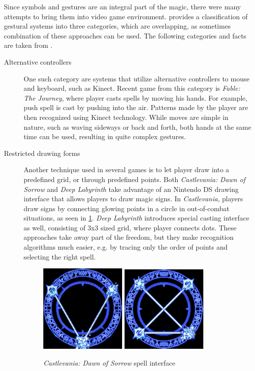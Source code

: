 Since symbols and gestures are an integral part of the magic, there were many attempts to bring them into video game environment. \citet{gameMagic} provides a classification of gestural systems into three categories, which are overlapping, as sometimes combination of these approaches can be used. The following categories and facts are taken from \citet{gameMagic}.

\begin{description}
\item[Alternative controllers]
One such category are systems that utilize alternative controllers to mouse and keyboard, such as Kinect. Recent game from this category is \emph{Fable: The Journey}, where player casts spells by moving his hands. For example, push spell is cast by pushing into the air. Patterns made by the player are then recognized using Kinect technology. While moves are simple in nature, such as waving sideways or back and forth, both hands at the same time can be used, resulting in quite complex gestures.

\item[Restricted drawing forms]
Another technique used in several games is to let player draw into a predefined grid, or through predefined points. Both \emph{Castlevania: Dawn of Sorrow} and \emph{Deep Labyrinth} take advantage of an Nintendo DS drawing interface that allows players to draw magic signs. 
In \emph{Castlevania}, players draw signs by connecting glowing points in a circle in out-of-combat situations, as seen in \cref{fig:castlevania}. \emph{Deep Labyrinth} introduces special casting interface as well, consisting of 3x3 sized grid, where player connects dots. These approaches take away part of the freedom, but they make recognition algorithms much easier, e.g. by tracing only the order of points and selecting the right spell.

\begin{figure}
\centering
\includegraphics[width=.3\linewidth]{ext/castlevania.png}
\quad
\includegraphics[width=.3\linewidth]{ext/castlevania2.png}
\label{fig:castlevania} %
\caption{\emph{Castlevania: Dawn of Sorrow} spell interface }
\end{figure}


\end{description}

